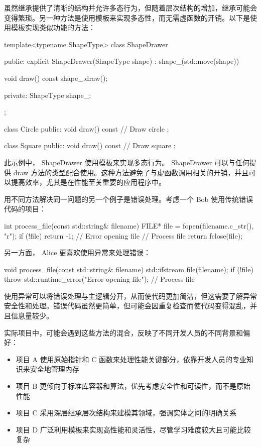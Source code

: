 虽然继承提供了清晰的结构并允许多态行为，但随着层次结构的增加，继承可能会变得繁琐。另一种方法是使用模板来实现多态性，而无需虚函数的开销。以下是使用模板实现类似功能的方法：

\begin{cpp}
template<typename ShapeType>
class ShapeDrawer {
public:
    explicit ShapeDrawer(ShapeType shape) : shape_(std::move(shape)){}

    void draw() const {
        shape_.draw();
    }

private:
    ShapeType shape_;
};

class Circle {
public:
    void draw() const {
        // Draw circle
    }
};

class Square {
public:
    void draw() const {
        // Draw square
    }
};
\end{cpp}

此示例中， ShapeDrawer 使用模板来实现多态行为。 ShapeDrawer 可以与任何提供 draw 方法的类型配合使用。这种方法避免了与虚函数调用相关的开销，并且可以提高效率，尤其是在性能至关重要的应用程序中。


用不同方法解决同一问题的另一个例子是错误处理。考虑一个 Bob 使用传统错误代码的项目：

\begin{cpp}
int process_file(const std::string& filename) {
    FILE* file = fopen(filename.c_str(), "r");
    if (!file) {
        return -1; // Error opening file
    }
    // Process file
    return fclose(file);
}
\end{cpp}

另一方面， Alice 更喜欢使用异常来处理错误：

\begin{cpp}
void process_file(const std::string& filename) {
    std::ifstream file(filename);
    if (!file) {
        throw std::runtime_error("Error opening file");
    }
    // Process file
}
\end{cpp}

使用异常可以将错误处理与主逻辑分开，从而使代码更加简洁，但这需要了解异常安全性和处理。错误代码虽然更简单，但可能会因重复检查而使代码变得混乱，并且信息量较少。


实际项目中，可能会遇到这些方法的混合，反映了不同开发人员的不同背景和偏好：

\begin{itemize}
\item
项目 A 使用原始指针和 C 函数来处理性能关键部分，依靠开发人员的专业知识来安全地管理内存

\item
项目 B 更倾向于标准库容器和算法，优先考虑安全性和可读性，而不是原始性能

\item
项目 C 采用深层继承层次结构来建模其领域，强调实体之间的明确关系

\item
项目 D 广泛利用模板来实现高性能和灵活性，尽管学习难度较大且可能比较复杂
\end{itemize}

